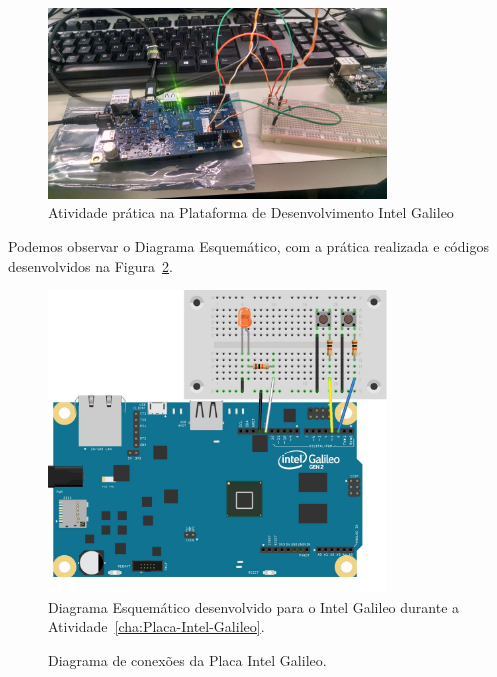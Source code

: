 \documentclass[
	12pt,				%
	openright,			%
  oneside,     %
	a4paper,			%
	english,			%
	french,				%
	spanish,			%
	brazil				%
	]{abntex2}
\begin{document}
\begin{figure}[ht]
  \centering
  \caption{\label{fig:IntelGalileo}Atividade prática na Plataforma de Desenvolvimento Intel Galileo}
  \includegraphics[width=0.8\textwidth]{images/Atividade08/IMG_20150721_145053115_HDR.jpg}
\end{figure}

Podemos observar o Diagrama Esquemático, com a prática realizada e códigos desenvolvidos na Figura~\ref{fig:05GalileoSchematic}.

\begin{figure}[ht]
  \centering
  \caption{\label{fig:05GalileoSchematic}Diagrama Esquemático desenvolvido para o Intel Galileo durante a Atividade~\ref{cha:Placa-Intel-Galileo}.}
  \includegraphics[width=0.8\textwidth]{images/Atividade08/05Schematic.jpg}
\end{figure}

\newpage
\begin{figure}[H]
  \centering
  \caption{\label{fig:cha-8-diagrama-conexoes-placa-galileo}Diagrama de conexões da Placa Intel Galileo.} 
   
\end{figure}
\end{document}
